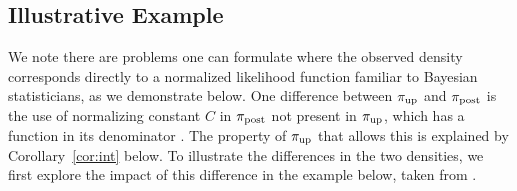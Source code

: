 \subsection{Illustrative Example}
We note there are problems one can formulate where the observed density corresponds directly to a normalized likelihood function familiar to Bayesian statisticians, as we demonstrate below.
One difference between $\operatorname*{\pi_{up}}$ and $\operatorname*{\pi_{post}}$ is the use of normalizing constant $C$ in $\operatorname*{\pi_{post}}$ not present in $\operatorname*{\pi_{up}}$, which has a function in its denominator .
The property of $\operatorname*{\pi_{up}}$ that allows this is explained by Corollary~\ref{cor:int} below.
To illustrate the differences in the two densities, we first explore the impact of this difference in the example below, taken from \cite{BJW18}.




